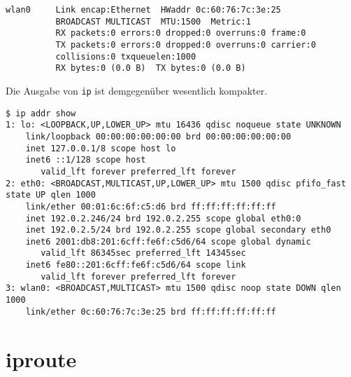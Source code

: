 \begin{normaltext}
\begin{verbatim}
wlan0     Link encap:Ethernet  HWaddr 0c:60:76:7c:3e:25  
          BROADCAST MULTICAST  MTU:1500  Metric:1
          RX packets:0 errors:0 dropped:0 overruns:0 frame:0
          TX packets:0 errors:0 dropped:0 overruns:0 carrier:0
          collisions:0 txqueuelen:1000 
          RX bytes:0 (0.0 B)  TX bytes:0 (0.0 B)
  \end{verbatim}
  Die Ausgabe von \verb?ip? ist demgegenüber wesentlich kompakter.
  \begin{verbatim}
$ ip addr show
1: lo: <LOOPBACK,UP,LOWER_UP> mtu 16436 qdisc noqueue state UNKNOWN 
    link/loopback 00:00:00:00:00:00 brd 00:00:00:00:00:00
    inet 127.0.0.1/8 scope host lo
    inet6 ::1/128 scope host 
       valid_lft forever preferred_lft forever
2: eth0: <BROADCAST,MULTICAST,UP,LOWER_UP> mtu 1500 qdisc pfifo_fast state UP qlen 1000
    link/ether 00:01:6c:6f:c5:d6 brd ff:ff:ff:ff:ff:ff
    inet 192.0.2.246/24 brd 192.0.2.255 scope global eth0:0
    inet 192.0.2.5/24 brd 192.0.2.255 scope global secondary eth0
    inet6 2001:db8:201:6cff:fe6f:c5d6/64 scope global dynamic 
       valid_lft 86345sec preferred_lft 14345sec
    inet6 fe80::201:6cff:fe6f:c5d6/64 scope link 
       valid_lft forever preferred_lft forever
3: wlan0: <BROADCAST,MULTICAST> mtu 1500 qdisc noop state DOWN qlen 1000
    link/ether 0c:60:76:7c:3e:25 brd ff:ff:ff:ff:ff:ff
  \end{verbatim}

\end{normaltext}

\section{iproute}
\label{sec:netz-werkzeuge-iproute}
\begin{abstractsec}
\end{abstractsec}
\begin{normaltext}
\end{normaltext}


